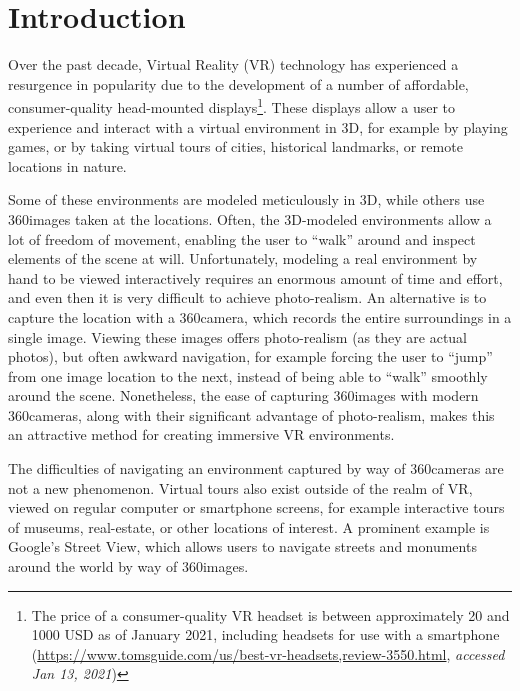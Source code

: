 \chapter{Introduction}

Over the past decade, Virtual Reality (VR) technology has experienced a resurgence in popularity due to the development of a number of affordable, consumer-quality head-mounted displays\footnote{The price of a consumer-quality VR headset is between approximately 20 and 1000 USD as of January 2021, including headsets for use with a smartphone (\url{https://www.tomsguide.com/us/best-vr-headsets,review-3550.html}, \emph{accessed Jan 13, 2021})}. These displays allow a user to experience and interact with a virtual environment in 3D, for example by playing games, or by taking virtual tours of cities, historical landmarks, or remote locations in nature.

Some of these environments are modeled meticulously in 3D, while others use 360\degree images taken at the locations. Often, the 3D-modeled environments allow a lot of freedom of movement, enabling the user to ``walk'' around and inspect elements of the scene at will. Unfortunately, modeling a real environment by hand to be viewed interactively requires an enormous amount of time and effort, and even then it is very difficult to achieve photo-realism. An alternative is to capture the location with a 360\degree camera, which records the entire surroundings in a single image. Viewing these images offers photo-realism (as they are actual photos), but often awkward navigation, for example forcing the user to ``jump'' from one image location to the next, instead of being able to ``walk'' smoothly around the scene. Nonetheless, the ease of capturing 360\degree images with modern 360\degree cameras, along with their significant advantage of photo-realism, makes this an attractive method for creating immersive VR environments.

The difficulties of navigating an environment captured by way of 360\degree cameras are not a new phenomenon. Virtual tours also exist outside of the realm of VR, viewed on regular computer or smartphone screens, for example interactive tours of museums, real-estate, or other locations of interest. A prominent example is Google's Street View, which allows users to navigate streets and monuments around the world by way of 360\degree images.

